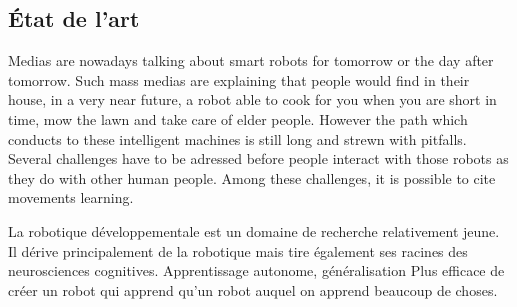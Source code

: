 \documentclass{llncs}
\begin{document}

\subsection{\'Etat de l'art}

Medias are nowadays talking about smart robots for tomorrow or the day after tomorrow. Such mass medias are explaining that people would find in their house, in a very near future,  a robot able to cook for you when you are short in time, mow the lawn and take care of elder people. However the path which conducts to these intelligent machines is still long and strewn with pitfalls. Several challenges have to be adressed before people interact with those robots as they do with other human people. Among these challenges, it is possible to cite movements learning.


La robotique développementale est un domaine de recherche relativement jeune. Il dérive principalement de la robotique mais tire également ses racines des neurosciences cognitives.
Apprentissage autonome, généralisation
Plus efficace de créer un robot qui apprend qu'un robot auquel on apprend beaucoup de choses.

\end{document}
